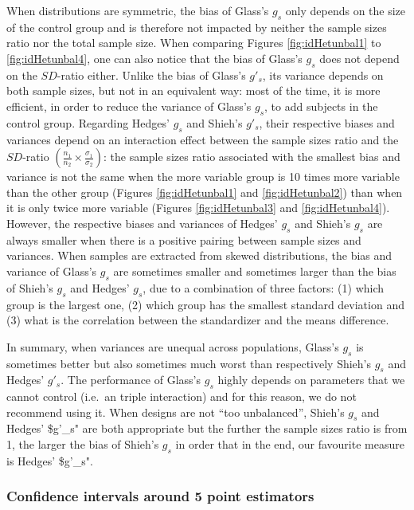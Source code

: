 \documentclass[
  man,floatsintext]{apa6}
\begin{document}
When distributions are symmetric, the bias of Glass's \(g_s\) only depends on the size of the control group and is therefore not impacted by neither the sample sizes ratio nor the total sample size. When comparing Figures \ref{fig:idHetunbal1} to \ref{fig:idHetunbal4}, one can also notice that the bias of Glass's \(g_s\) does not depend on the \(SD\)-ratio either. Unlike the bias of Glass's \(g'_s\), its variance depends on both sample sizes, but not in an equivalent way: most of the time, it is more efficient, in order to reduce the variance of Glass's \(g_s\), to add subjects in the control group. Regarding Hedges' \(g_s\) and Shieh's \(g'_s\), their respective biases and variances depend on an interaction effect between the sample sizes ratio and the \(SD\)-ratio \(\left( \frac{n_1}{n_2} \times \frac{\sigma_1}{\sigma_2} \right)\): the sample sizes ratio associated with the smallest bias and variance is not the same when the more variable group is 10 times more variable than the other group (Figures \ref{fig:idHetunbal1} and \ref{fig:idHetunbal2}) than when it is only twice more variable (Figures \ref{fig:idHetunbal3} and \ref{fig:idHetunbal4}). However, the respective biases and variances of Hedges' \(g_s\) and Shieh's \(g_s\) are always smaller when there is a positive pairing between sample sizes and variances. When samples are extracted from skewed distributions, the bias and variance of Glass's \(g_s\) are sometimes smaller and sometimes larger than the bias of Shieh's \(g_s\) and Hedges' \(g_s\), due to a combination of three factors: (1) which group is the largest one, (2) which group has the smallest standard deviation and (3) what is the correlation between the standardizer and the means difference.

In summary, when variances are unequal across populations, Glass's \(g_s\) is sometimes better but also sometimes much worst than respectively Shieh's \(g_s\) and Hedges' \(g'_s\). The performance of Glass's \(g_s\) highly depends on parameters that we cannot control (i.e.~an triple interaction) and for this reason, we do not recommend using it. When designs are not \enquote{too unbalanced}, Shieh's \(g_s\) and Hedges' \$g'\_s" are both appropriate but the further the sample sizes ratio is from 1, the larger the bias of Shieh's \(g_s\) in order that in the end, our favourite measure is Hedges' \$g'\_s".

\hypertarget{confidence-intervals-around-5-point-estimators}{%
\subsubsection{Confidence intervals around 5 point estimators}\label{confidence-intervals-around-5-point-estimators}}
\end{document}
